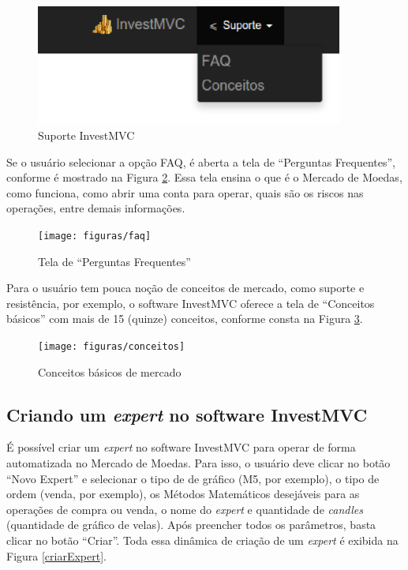 \begin{figure}[H]
\centering
\includegraphics[width=0.9\textwidth]{figuras/navSuporte}
\caption{Suporte InvestMVC}
\label{navSuporte}
\end{figure}

Se o usuário selecionar a opção FAQ, é aberta a tela de “Perguntas Frequentes”, conforme é mostrado na Figura \ref{faq}. Essa tela ensina o que é o Mercado de Moedas, como funciona, como abrir uma conta para operar, quais são os riscos nas operações, entre demais informações. 

\begin{figure}[H]
\centering
\texttt{[image: figuras/faq]}
\caption{Tela de “Perguntas Frequentes”}
\label{faq}
\end{figure}

Para o usuário tem pouca noção de conceitos de mercado, como suporte e resistência, por exemplo, o software InvestMVC oferece a tela de “Conceitos básicos” com mais de 15 (quinze) conceitos, conforme consta na Figura \ref{conceitos}. 

\begin{figure}[H]
\centering
\texttt{[image: figuras/conceitos]}
\caption{Conceitos básicos de mercado}
\label{conceitos}
\end{figure}

\subsection{Criando um \textit{expert} no software InvestMVC}
É possível criar um \textit{expert} no software InvestMVC para operar de forma automatizada no Mercado de Moedas. Para isso, o usuário deve clicar no botão “Novo Expert” e selecionar o tipo de de gráfico (M5, por exemplo), o tipo de ordem (venda, por exemplo), os Métodos Matemáticos desejáveis para as operações de compra ou venda, o nome do \textit{expert} e quantidade de \textit{candles} (quantidade de gráfico de velas). Após preencher todos os parâmetros, basta clicar no botão “Criar”. Toda essa dinâmica de criação de um \textit{expert} é exibida na Figura \ref{criarExpert}.

